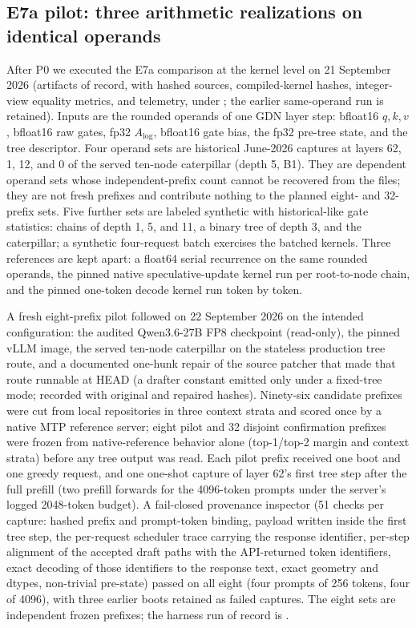 \documentclass[conference]{IEEEtran}
\begin{document}
\subsection{E7a pilot: three arithmetic realizations on identical operands}
\label{sec:e7a-pilot}
After P0 we executed the E7a comparison at the kernel level on 21 September 2026 (artifacts of record, with hashed sources, compiled-kernel hashes, integer-view equality metrics, and telemetry, under ; the earlier same-operand run  is retained). Inputs are the rounded operands of one GDN layer step: bfloat16 $q,k,v$, bfloat16 raw gates, fp32 $A_{\log}$, bfloat16 gate bias, the fp32 pre-tree state, and the tree descriptor. Four operand sets are historical June-2026 captures at layers 62, 1, 12, and 0 of the served ten-node caterpillar (depth 5, B1). They are dependent operand sets whose independent-prefix count cannot be recovered from the files; they are not fresh prefixes and contribute nothing to the planned eight- and 32-prefix sets. Five further sets are labeled synthetic with historical-like gate statistics: chains of depth 1, 5, and 11, a binary tree of depth 3, and the caterpillar; a synthetic four-request batch exercises the batched kernels. Three references are kept apart: a float64 serial recurrence on the same rounded operands, the pinned native speculative-update kernel run per root-to-node chain, and the pinned one-token decode kernel run token by token.

A fresh eight-prefix pilot followed on 22 September 2026 on the intended configuration: the audited Qwen3.6-27B FP8 checkpoint (read-only), the pinned vLLM image, the served ten-node caterpillar on the stateless production tree route, and a documented one-hunk repair of the source patcher that made that route runnable at HEAD (a drafter constant emitted only under a fixed-tree mode; recorded with original and repaired hashes). Ninety-six candidate prefixes were cut from local repositories in three context strata and scored once by a native MTP reference server; eight pilot and 32 disjoint confirmation prefixes were frozen from native-reference behavior alone (top-1/top-2 margin and context strata) before any tree output was read. Each pilot prefix received one boot and one greedy request, and one one-shot capture of layer 62's first tree step after the full prefill (two prefill forwards for the 4096-token prompts under the server's logged 2048-token budget). A fail-closed provenance inspector (51 checks per capture: hashed prefix and prompt-token binding, payload written inside the first tree step, the per-request scheduler trace carrying the response identifier, per-step alignment of the accepted draft paths with the API-returned token identifiers, exact decoding of those identifiers to the response text, exact geometry and dtypes, non-trivial pre-state) passed on all eight (four prompts of 256 tokens, four of 4096), with three earlier boots retained as failed captures. The eight sets are independent frozen prefixes; the harness run of record is .
\end{document}
